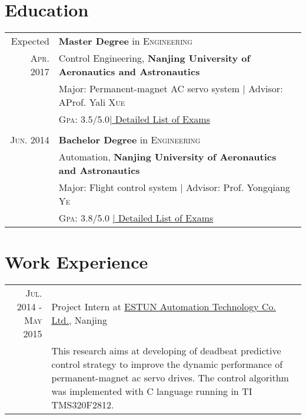 \documentclass[a4paper,10pt]{article} %
\begin{document}

\section{Education}

\begin{tabular}{rl}	
Expected & \textbf{Master Degree} in \textsc{Engineering} \\
\textsc{Apr.} 2017 & Control Engineering, \textbf{Nanjing University of Aeronautics and Astronautics}\\
& Major: Permanent-magnet AC servo system | \small Advisor: AProf. Yali \textsc{Xue}\\
&\normalsize \textsc{Gpa}: 3.5/5.0\hyperlink{grds_me}{\hfill | \footnotesize Detailed List of Exams}\\
&\\


\textsc{Jun.} 2014& \textbf{Bachelor Degree} in \textsc{}\textsc{Engineering} \\
&Automation, \normalsize\textbf{Nanjing University of Aeronautics and Astronautics}\\
& Major: Flight control system | \small Advisor: Prof. Yongqiang \textsc{Ye}\\
&\normalsize \textsc{Gpa}: 3.8/5.0 \hyperlink{grds_be}{\hfill| \footnotesize Detailed List of Exams}


\end{tabular}


\section{Work Experience}

\begin{tabular}{r|p{11cm}}
\textsc{Jul. 2014 - May 2015} & Project Intern at \href{http://www.estun.cn/}{ESTUN Automation Technology Co. Ltd.}, Nanjing \emph{}\\
& \footnotesize{This research aims at developing of deadbeat predictive control strategy to improve the dynamic performance of permanent-magnet ac servo drives. The control algorithm was implemented with C language running in TI TMS320F2812.}
\end{tabular}
\end{document}
